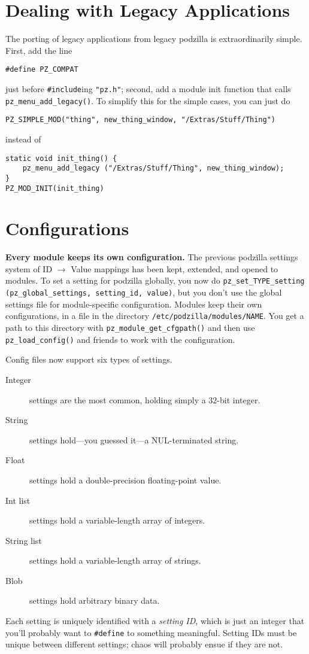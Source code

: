 \documentclass[12pt,letterpaper]{report}
\begin{document}
\section{Dealing with Legacy Applications}
The porting of legacy applications from legacy podzilla is extraordinarily simple. First, add the
line
\begin{verbatim}
#define PZ_COMPAT
\end{verbatim}
just before \verb|#include|ing \verb|"pz.h"|; second, add a module init function that calls
\verb|pz_menu_add_legacy()|. To simplify this for the simple cases, you can just do
\begin{verbatim}
PZ_SIMPLE_MOD("thing", new_thing_window, "/Extras/Stuff/Thing")
\end{verbatim}
instead of
\begin{verbatim}
static void init_thing() {
    pz_menu_add_legacy ("/Extras/Stuff/Thing", new_thing_window);
}
PZ_MOD_INIT(init_thing)
\end{verbatim}

\section{Configurations}
{\bf Every module keeps its own configuration.} The previous podzilla settings system of
ID $\to$ Value mappings has been kept, extended, and opened to modules. To set a setting
for podzilla globally, you now do \verb|pz_set_TYPE_setting (pz_global_settings, setting_id, value)|,
but you don't use the global settings file for module-specific configuration. Modules keep
their own configurations, in a file in the directory \verb|/etc/podzilla/|\hskip0pt\verb|modules/NAME|. You
get a path to this directory with \verb|pz_module_get_cfgpath()| and then use \verb|pz_load_config()|
and friends to work with the configuration.

Config files now support six types of settings.
\begin{description}
\item[Integer] settings are the most common, holding simply a 32-bit integer.
\item[String] settings hold---you guessed it---a NUL-terminated string.
\item[Float] settings hold a double-precision floating-point value.
\item[Int list] settings hold a variable-length array of integers.
\item[String list] settings hold a variable-length array of strings.
\item[Blob] settings hold arbitrary binary data.
\end{description}
Each setting is uniquely identified with a {\sl setting ID}, which is just an integer that
you'll probably want to \verb|#define| to something meaningful. Setting IDs must be unique
between different settings; chaos will probably ensue if they are not.
\end{document}
